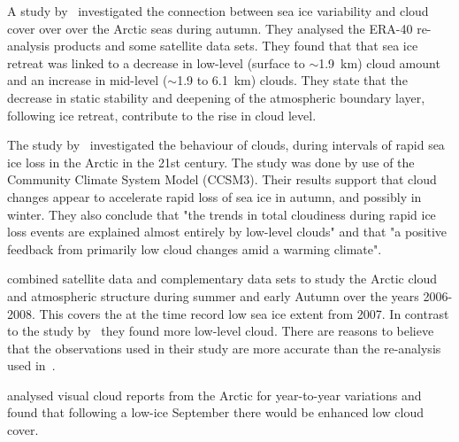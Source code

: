 
A study by~\citet{Schweiger2008} investigated the connection between sea ice variability and cloud cover over over the Arctic seas during autumn. They analysed the ERA-40 re-analysis products and some satellite data sets. %
They found that that sea ice retreat was linked to a decrease in low-level (surface to $\sim$1.9~km) cloud amount and an increase in mid-level ($\sim$1.9 to 6.1~km) clouds. They state that the decrease in static stability and deepening of the atmospheric boundary layer, following ice retreat, contribute to the rise in cloud level. 

The study by~\citet{Vavrus2010} investigated the behaviour of clouds, during intervals of rapid sea ice loss in the Arctic in the 21st century. The study was done by use of the Community Climate System Model (CCSM3). Their results support that cloud changes appear to accelerate rapid loss of sea ice in autumn, and possibly in winter. They also conclude that "the trends in total cloudiness during rapid ice loss events are explained almost entirely by low-level clouds" and that "a positive feedback from primarily low cloud changes amid a warming climate".

\citet{Kay2009} combined satellite data and complementary data sets to study the Arctic cloud and atmospheric structure during summer and early Autumn over the years 2006-2008. This covers the at the time record low sea ice extent from 2007. In contrast to the study by~\citet{Schweiger2008} they found more low-level cloud. There are reasons to believe that the observations used in their study are more accurate than the re-analysis used in~\citet{Schweiger2008}.


\citet{Eastman2010a} analysed visual cloud reports from the Arctic for year-to-year variations and found that following a low-ice September there would be enhanced low cloud cover.

